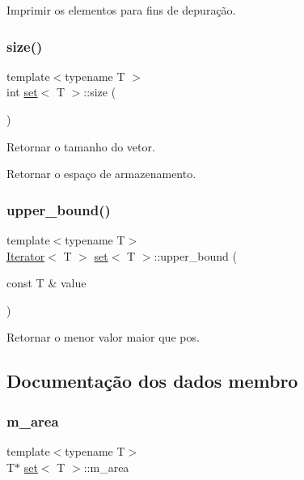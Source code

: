 Imprimir os elementos para fins de depuração. 

\mbox{\label{classset_ac9b2b107eb53dabc41c9c551979b681a}} 
\subsubsection{\texorpdfstring{size()}{size()}}
{\footnotesize\ttfamily template$<$typename T $>$ \\
int \hyperlink{classset}{set}$<$ T $>$\+::size (\begin{DoxyParamCaption}{ }\end{DoxyParamCaption})}



Retornar o tamanho do vetor. 

Retornar o espaço de armazenamento. \mbox{\label{classset_af214bb499a1adca6a48fe8591377ea78}} 
\subsubsection{\texorpdfstring{upper\+\_\+bound()}{upper\_bound()}}
{\footnotesize\ttfamily template$<$typename T$>$ \\
\hyperlink{classIterator}{Iterator}$<$ T $>$ \hyperlink{classset}{set}$<$ T $>$\+::upper\+\_\+bound (\begin{DoxyParamCaption}\item[{const T \&}]{value }\end{DoxyParamCaption})}



Retornar o menor valor maior que pos. 



\subsection{Documentação dos dados membro}
\mbox{\label{classset_a68aeeb12ca554936bb77a50df1471ab7}} 
\subsubsection{\texorpdfstring{m\+\_\+area}{m\_area}}
{\footnotesize\ttfamily template$<$typename T$>$ \\
T$\ast$ \hyperlink{classset}{set}$<$ T $>$\+::m\+\_\+area\hspace{0.3cm}{\ttfamily [private]}}

